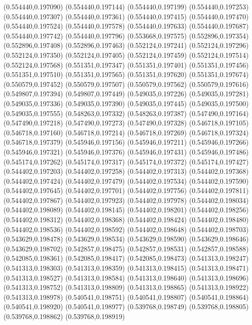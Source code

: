 (0.554440,0.197090)
(0.554440,0.197144)
(0.554440,0.197199)
(0.554440,0.197253)
(0.554440,0.197307)
(0.554440,0.197361)
(0.554440,0.197415)
(0.554440,0.197470)
(0.554440,0.197524)
(0.554440,0.197578)
(0.554440,0.197633)
(0.554440,0.197687)
(0.554440,0.197742)
(0.554440,0.197796)
(0.553668,0.197575)
(0.552896,0.197354)
(0.552896,0.197408)
(0.552896,0.197463)
(0.552124,0.197241)
(0.552124,0.197296)
(0.552124,0.197350)
(0.552124,0.197405)
(0.552124,0.197459)
(0.552124,0.197514)
(0.552124,0.197568)
(0.551351,0.197347)
(0.551351,0.197401)
(0.551351,0.197456)
(0.551351,0.197510)
(0.551351,0.197565)
(0.551351,0.197620)
(0.551351,0.197674)
(0.550579,0.197452)
(0.550579,0.197507)
(0.550579,0.197562)
(0.550579,0.197616)
(0.549807,0.197394)
(0.549807,0.197449)
(0.549035,0.197226)
(0.549035,0.197281)
(0.549035,0.197336)
(0.549035,0.197390)
(0.549035,0.197445)
(0.549035,0.197500)
(0.549035,0.197555)
(0.548263,0.197332)
(0.548263,0.197387)
(0.547490,0.197164)
(0.547490,0.197218)
(0.547490,0.197273)
(0.547490,0.197328)
(0.546718,0.197105)
(0.546718,0.197160)
(0.546718,0.197214)
(0.546718,0.197269)
(0.546718,0.197324)
(0.546718,0.197379)
(0.545946,0.197156)
(0.545946,0.197211)
(0.545946,0.197266)
(0.545946,0.197321)
(0.545946,0.197376)
(0.545946,0.197431)
(0.545946,0.197486)
(0.545174,0.197262)
(0.545174,0.197317)
(0.545174,0.197372)
(0.545174,0.197427)
(0.544402,0.197203)
(0.544402,0.197258)
(0.544402,0.197313)
(0.544402,0.197368)
(0.544402,0.197424)
(0.544402,0.197479)
(0.544402,0.197534)
(0.544402,0.197590)
(0.544402,0.197645)
(0.544402,0.197701)
(0.544402,0.197756)
(0.544402,0.197811)
(0.544402,0.197867)
(0.544402,0.197923)
(0.544402,0.197978)
(0.544402,0.198034)
(0.544402,0.198089)
(0.544402,0.198145)
(0.544402,0.198201)
(0.544402,0.198256)
(0.544402,0.198312)
(0.544402,0.198368)
(0.544402,0.198424)
(0.544402,0.198480)
(0.544402,0.198536)
(0.544402,0.198592)
(0.544402,0.198648)
(0.544402,0.198703)
(0.543629,0.198478)
(0.543629,0.198534)
(0.543629,0.198590)
(0.543629,0.198646)
(0.543629,0.198702)
(0.542857,0.198475)
(0.542857,0.198531)
(0.542857,0.198588)
(0.542085,0.198361)
(0.542085,0.198417)
(0.542085,0.198473)
(0.541313,0.198247)
(0.541313,0.198303)
(0.541313,0.198359)
(0.541313,0.198415)
(0.541313,0.198471)
(0.541313,0.198527)
(0.541313,0.198584)
(0.541313,0.198640)
(0.541313,0.198696)
(0.541313,0.198752)
(0.541313,0.198809)
(0.541313,0.198865)
(0.541313,0.198922)
(0.541313,0.198978)
(0.540541,0.198751)
(0.540541,0.198807)
(0.540541,0.198864)
(0.540541,0.198920)
(0.540541,0.198977)
(0.539768,0.198749)
(0.539768,0.198805)
(0.539768,0.198862)
(0.539768,0.198919)
